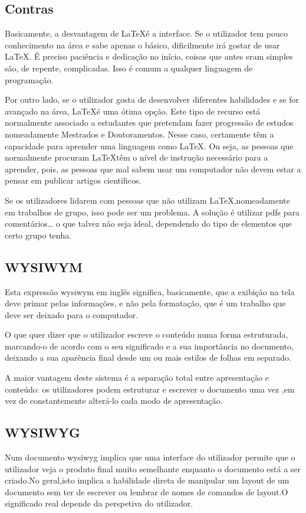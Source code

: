 \subsection{Contras}
Basicamente, a desvantagem de \LaTeX é a interface. Se o utilizador tem pouco conhecimento na área e sabe apenas o básico, dificilmente irá gostar de usar \LaTeX. É preciso paciência e dedicação no início, coisas que antes eram simples são, de repente, complicadas. Isso é comum a qualquer linguagem de programação.

Por outro lado, se o utilizador gosta de desenvolver diferentes habilidades e se for avançado na área, \LaTeX é uma ótima opção. Este tipo de recurso está normalmente associado a estudantes que pretendam fazer progressão de estudos nomeadamente Mestrados e Doutoramentos. Nesse caso, certamente têm a capacidade para aprender uma linguagem como \LaTeX. Ou seja, as pessoas que normalmente procuram \LaTeX têm o nível de instrução necessário para a aprender, pois, as pessoas que mal sabem usar um computador não devem estar a pensar em publicar artigos científicos.

Se os utilizadores lidarem com pessoas que não utilizam \LaTeX ,nomeadamente em trabalhos de grupo, isso pode ser um problema. A solução é utilizar pdfs para comentários… o que talvez não seja ideal, dependendo do tipo de elementos que certo grupo tenha.

\subsection{WYSIWYM}
Esta expressão \ac{wysiwym} em inglês significa, basicamente, que a exibição na tela deve primar pelas informações, e não pela formatação, que é um trabalho que deve ser deixado para o computador.

O que quer dizer que o utilizador escreve o conteúdo numa forma estruturada, marcando-o de acordo com o seu significado e a sua importância no documento, deixando a sua aparência final desde um ou mais estilos de folhas em separado.

A maior vantagem deste sistema é a separação total entre apresentação e conteúdo: os utilizadores podem estruturar e escrever o documento uma vez ,em vez de constantemente alterá-lo cada modo de apresentação.

\subsection{WYSIWYG}
Num documento  \ac{wysiwyg} implica que uma interface do utilizador permite que o utilizador veja o produto final muito semelhante enquanto o documento está a ser criado.No geral,isto implica a habilidade direta de manipular um layout de um documento sem ter de escrever ou lembrar de nomes de comandos de layout.O significado real depende da perspetiva do utilizador.

